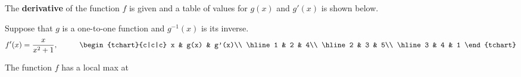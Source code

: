 \documentclass{ximera}
\author{Gregory Hartman \and Matthew Carr}
\begin{document}
\begin{exercise}



The \textbf{derivative} of the function $f$ is given and a table of values for $g(x)$ and $g'(x)$ is shown below.

Suppose that $g$ is a one-to-one function and $g^{-1}(x)$ is its inverse.
\[
f'(x)=\frac{x}{x^2+1},\hskip 1cm
\begin{tchart}{c|c|c}
x & g(x) & g'(x)\\ \hline
1 & 2 & 4\\ \hline
2 & 3 & 5\\ \hline
3 & 4 & 1
\end{tchart}
\]

The function $f$ has a local max at
\begin{prompt}
\begin{multipleChoice}
\end{multipleChoice}
\end{prompt}

\end{exercise}
\end{document}
